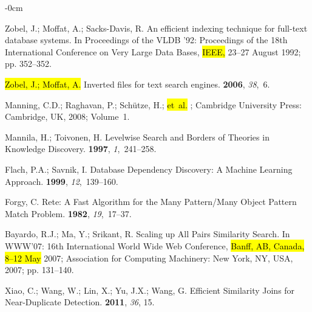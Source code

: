 \documentclass[algorithms,article,accept,pdftex,moreauthors]{Definitions/mdpi}
\begin{document}
\begin{adjustwidth}{-\extralength}{0cm}
\begin{thebibliography}{999}
Zobel, J.; Moffat, A.; Sacks-Davis, R.
\newblock An efficient indexing technique for full-text database systems.
\newblock In Proceedings of the VLDB '92: Proceedings of the 18th International Conference on Very Large Data Bases, \hl{IEEE,} %
 23--27 August 1992; pp. 352--352.

\hl{Zobel, J.; Moffat, A.}  %
\newblock Inverted files for text search engines.
 {\bf 2006}, {\em 38},~6.

Manning, C.D.; Raghavan, P.; Sch{\"u}tze, H.;  \hl{et~al.} %
; Cambridge
  University Press: Cambridge, UK, 2008; Volume~1.

Mannila, H.; Toivonen, H.
\newblock Levelwise Search and Borders of Theories in Knowledge Discovery.
 {\bf 1997}, {\em
  1},~241--258.

Flach, P.A.; Savnik, I.
\newblock Database Dependency Discovery: A Machine Learning Approach.
 {\bf 1999}, {\em 12},~139--160.

Forgy, C.
\newblock Rete: A Fast Algorithm for the Many Pattern/Many Object Pattern Match
  Problem.
 {\bf 1982}, {\em 19},~17--37.

Bayardo, R.J.; Ma, Y.; Srikant, R.
\newblock Scaling up All Pairs Similarity Search.
\newblock In WWW'07: 16th International World Wide Web Conference, \hl{Banff, AB, Canada, 8--12 May} %
 2007;  Association for Computing Machinery: New York,
  NY, USA,  2007; pp. 131–140.

Xiao, C.; Wang, W.; Lin, X.; Yu, J.X.; Wang, G.
\newblock Efficient Similarity Joins for Near-Duplicate Detection.
 {\bf 2011}, {\em 36}, 15.


\end{thebibliography}
\end{adjustwidth}
\end{document}
